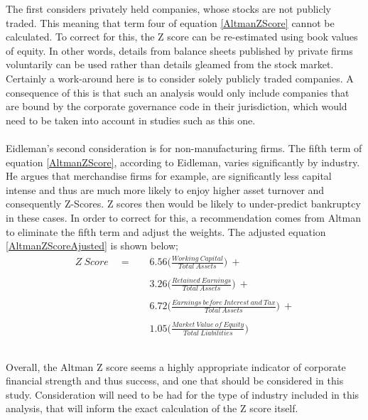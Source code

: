 {The first considers privately held companies, whose stocks are not publicly traded. This meaning that term four of equation \ref{AltmanZScore} cannot be calculated. To correct for this, the Z score can be re-estimated using book values of equity. In other words, details from balance sheets published by private firms voluntarily can be used rather than details gleamed from the stock market. Certainly a work-around here is to consider solely publicly traded companies. A consequence of this is that such an analysis would only include companies that are bound by the corporate governance code in their jurisdiction, which would need to be taken into account in studies such as this one.\\\\ Eidleman's second consideration is for non-manufacturing firms. The fifth term of equation \ref{AltmanZScore}, according to Eidleman, varies significantly by industry. He argues that merchandise firms for example, are significantly less capital intense and thus are much more likely to enjoy higher asset turnover and consequently Z-Scores. Z scores then would be likely to under-predict bankruptcy in these cases. In order to correct for this, a recommendation comes from Altman to eliminate the fifth term and adjust the weights. 
\clearpage
The adjusted equation \ref{AltmanZScoreAjusted} is shown below;
\begin {equation}\label{AltmanZScoreAjusted}
\begin{aligned}
Z \ Score \quad =  \quad & 6.56\bigg(\frac{Working \ Capital}{Total \ Assets}\bigg) \ + \\\\
		& 3.26\bigg({\frac{Retained \ Earnings}{Total \ Assets}}\bigg) \ + \\\\
		& 6.72\bigg({\frac{Earnings \ before \ Interest \ and \ Tax}{Total \ Assets}}\bigg) \ + \\\\
		& 1.05\bigg({\frac{Market \ Value \ of \ Equity}{Total \ Liabilities}}\bigg) \ \\\\ 
\end{aligned}
\end{equation}\\
Overall, the Altman Z score seems a highly appropriate indicator of corporate financial strength and thus success, and one that should be considered in this study. Consideration will need to be had for the type of industry included in this analysis, that will inform the exact calculation of the Z score itself. }\\\\
